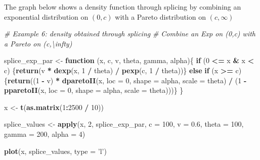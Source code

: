 \documentclass[]{book}
\newenvironment{Shaded}{\begin{snugshade}}{\end{snugshade}}
\newcommand{\KeywordTok}[1]{\textcolor[rgb]{0.13,0.29,0.53}{\textbf{#1}}}
\newcommand{\DataTypeTok}[1]{\textcolor[rgb]{0.13,0.29,0.53}{#1}}
\newcommand{\DecValTok}[1]{\textcolor[rgb]{0.00,0.00,0.81}{#1}}
\newcommand{\FloatTok}[1]{\textcolor[rgb]{0.00,0.00,0.81}{#1}}
\newcommand{\StringTok}[1]{\textcolor[rgb]{0.31,0.60,0.02}{#1}}
\newcommand{\CommentTok}[1]{\textcolor[rgb]{0.56,0.35,0.01}{\textit{#1}}}
\newcommand{\ControlFlowTok}[1]{\textcolor[rgb]{0.13,0.29,0.53}{\textbf{#1}}}
\newcommand{\OperatorTok}[1]{\textcolor[rgb]{0.81,0.36,0.00}{\textbf{#1}}}
\newcommand{\NormalTok}[1]{#1}
\theoremstyle{definition}
\theoremstyle{definition}
\theoremstyle{definition}
\theoremstyle{remark}
\begin{document}
The graph below shows a density function through splicing by combining
an exponential distribution on \((0,c)\) with a Pareto distribution on
\((c,\infty)\)

\begin{Shaded}
\begin{Highlighting}[]
\CommentTok{# Example 6: density obtained through splicing}
\CommentTok{# Combine an Exp on (0,c) with a Pareto on (c,\textbackslash{}infty)}

\NormalTok{splice_exp_par <-}\StringTok{ }\ControlFlowTok{function}\NormalTok{ (x, c, v, theta, gamma, alpha)\{}
  \ControlFlowTok{if}\NormalTok{ (}\DecValTok{0} \OperatorTok{<=}\StringTok{ }\NormalTok{x }\OperatorTok{&}\StringTok{ }\NormalTok{x }\OperatorTok{<}\StringTok{ }\NormalTok{c) \{}\KeywordTok{return}\NormalTok{(v }\OperatorTok{*}\StringTok{ }\KeywordTok{dexp}\NormalTok{(x, }\DecValTok{1} \OperatorTok{/}\StringTok{ }\NormalTok{theta) }\OperatorTok{/}\StringTok{ }\KeywordTok{pexp}\NormalTok{(c, }\DecValTok{1} \OperatorTok{/}\StringTok{ }\NormalTok{theta))\} }\ControlFlowTok{else} 
    \ControlFlowTok{if}\NormalTok{ (x }\OperatorTok{>=}\StringTok{ }\NormalTok{c) \{}\KeywordTok{return}\NormalTok{((}\DecValTok{1} \OperatorTok{-}\StringTok{ }\NormalTok{v) }\OperatorTok{*}\StringTok{ }\KeywordTok{dparetoII}\NormalTok{(x, }\DataTypeTok{loc =} \DecValTok{0}\NormalTok{, }\DataTypeTok{shape =}\NormalTok{ alpha, }\DataTypeTok{scale =}\NormalTok{ theta) }\OperatorTok{/}\StringTok{ }
\StringTok{                          }\NormalTok{(}\DecValTok{1} \OperatorTok{-}\StringTok{ }\KeywordTok{pparetoII}\NormalTok{(x, }\DataTypeTok{loc =} \DecValTok{0}\NormalTok{, }\DataTypeTok{shape =}\NormalTok{ alpha, }\DataTypeTok{scale =}\NormalTok{ theta)))\}}
\NormalTok{\}}

\NormalTok{x <-}\StringTok{ }\KeywordTok{t}\NormalTok{(}\KeywordTok{as.matrix}\NormalTok{(}\DecValTok{1}\OperatorTok{:}\DecValTok{2500} \OperatorTok{/}\StringTok{ }\DecValTok{10}\NormalTok{))}

\NormalTok{splice_values <-}\StringTok{ }\KeywordTok{apply}\NormalTok{(x, }\DecValTok{2}\NormalTok{, splice_exp_par, }\DataTypeTok{c =} \DecValTok{100}\NormalTok{, }\DataTypeTok{v =} \FloatTok{0.6}\NormalTok{, }
                       \DataTypeTok{theta =} \DecValTok{100}\NormalTok{, }\DataTypeTok{gamma =} \DecValTok{200}\NormalTok{, }\DataTypeTok{alpha =} \DecValTok{4}\NormalTok{)}

\KeywordTok{plot}\NormalTok{(x, splice_values, }\DataTypeTok{type =} \StringTok{'l'}\NormalTok{)}
\end{Highlighting}
\end{Shaded}
\end{document}

